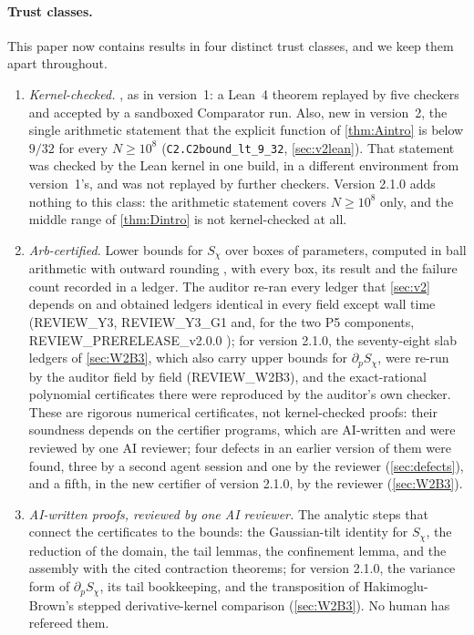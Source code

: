 \documentclass[11pt]{article}
\theoremstyle{definition}
\newcommand{\lean}[1]{\texttt{#1}}
\begin{document}
\paragraph{Trust classes.} This paper now contains results in four distinct trust classes, and we keep them apart throughout.
\begin{enumerate}[label=(T\arabic*)]
\item\label{T1} \emph{Kernel-checked.} , as in version~1: a Lean~4 theorem replayed by five checkers and accepted by a sandboxed Comparator run. Also, new in version~2, the single arithmetic statement that the explicit function of \cref{thm:Aintro} is below $9/32$ for every $N \ge 10^8$ (\lean{C2.C2bound\_\allowbreak{}lt\_\allowbreak{}9\_\allowbreak{}32}, \cref{sec:v2lean}). That statement was checked by the Lean kernel in one build, in a different environment from version~1's, and was not replayed by further checkers. Version 2.1.0 adds nothing to this class: the arithmetic statement covers $N \ge 10^8$ only, and the middle range of \cref{thm:Dintro} is not kernel-checked at all.
\item\label{T2} \emph{Arb-certified.} Lower bounds for $S_\chi$ over boxes of parameters, computed in ball arithmetic with outward rounding \cite{flint}, with every box, its result and the failure count recorded in a ledger. The auditor re-ran every ledger that \cref{sec:v2} depends on and obtained ledgers identical in every field except wall time (REVIEW\_Y3, REVIEW\_Y3\_G1 and, for the two P5 components, REVIEW\_PRERELEASE\_v2.0.0 \cite{dq1records}); for version 2.1.0, the seventy-eight slab ledgers of \cref{sec:W2B3}, which also carry upper bounds for $\partial_pS_\chi$, were re-run by the auditor field by field (REVIEW\_W2B3), and the exact-rational polynomial certificates there were reproduced by the auditor's own checker. These are rigorous numerical certificates, not kernel-checked proofs: their soundness depends on the certifier programs, which are AI-written and were reviewed by one AI reviewer; four defects in an earlier version of them were found, three by a second agent session and one by the reviewer (\cref{sec:defects}), and a fifth, in the new certifier of version 2.1.0, by the reviewer (\cref{sec:W2B3}).
\item\label{T3} \emph{AI-written proofs, reviewed by one AI reviewer.} The analytic steps that connect the certificates to the bounds: the Gaussian-tilt identity for $S_\chi$, the reduction of the domain, the tail lemmas, the confinement lemma, and the assembly with the cited contraction theorems; for version 2.1.0, the variance form of $\partial_pS_\chi$, its tail bookkeeping, and the transposition of Hakimoglu-Brown's stepped derivative-kernel comparison (\cref{sec:W2B3}). No human has refereed them.

\end{enumerate}
\end{document}
